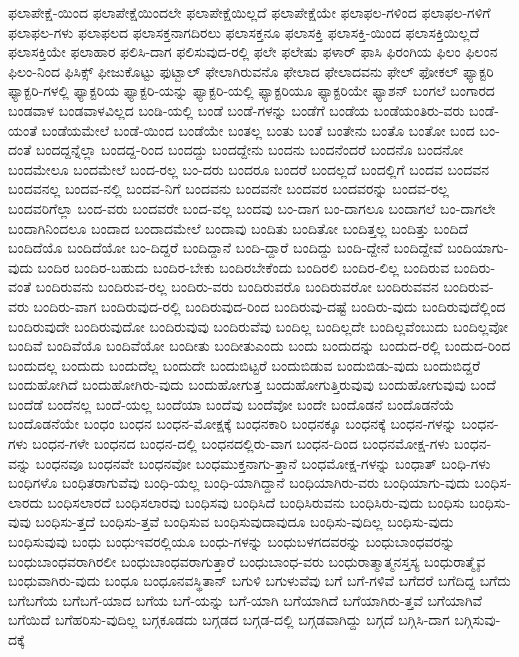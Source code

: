 {ಫಲಾಪೇಕ್ಷೆ-ಯಿಂದ
ಫಲಾಪೇಕ್ಷೆಯಿಂದಲೇ
ಫಲಾಪೇಕ್ಷೆಯಿಲ್ಲದೆ
ಫಲಾಪೇಕ್ಷೆಯೇ
ಫಲಾಫಲ-ಗಳಿಂದ
ಫಲಾಫಲ-ಗಳಿಗೆ
ಫಲಾಫಲ-ಗಳು
ಫಲಾಫಲದ
ಫಲಾಸಕ್ತನಾಗದಿರಲು
ಫಲಾಸಕ್ತನೂ
ಫಲಾಸಕ್ತಿ
ಫಲಾಸಕ್ತಿ-ಯಿಂದ
ಫಲಾಸಕ್ತಿಯಿಲ್ಲದೆ
ಫಲಾಸಕ್ತಿಯೇ
ಫಲಾಹಾರ
ಫಲಿಸಿ-ದಾಗ
ಫಲಿಸುವುದ-ರಲ್ಲಿ
ಫಲೇ
ಫಲೇಷು
ಫಳಾರ್
ಫಾಸಿ
ಫಿರಂಗಿಯ
ಫಿಲಂ
ಫಿಲಂನ
ಫಿಲಂ-ನಿಂದ
ಫಿಸಿಕ್ಸ್
ಫೀಜುಕೊಟ್ಟು
ಫುಟ್ಬಾಲ್
ಫೇಲಾಗಿರುವನೊ
ಫೇಲಾದ
ಫೇಲಾದವನು
ಫೇಲ್
ಫೋಕಲ್
ಫ್ಯಾಕ್ಟರಿ
ಫ್ಯಾಕ್ಟರಿ-ಗಳಲ್ಲಿ
ಫ್ಯಾಕ್ಟರಿಯ
ಫ್ಯಾಕ್ಟರಿ-ಯನ್ನು
ಫ್ಯಾಕ್ಟರಿ-ಯಲ್ಲಿ
ಫ್ಯಾಕ್ಟರಿಯೂ
ಫ್ಯಾಕ್ಟರಿಯೇ
ಫ್ಯಾಶನ್
ಬಂಗಲೆ
ಬಂಗಾರದ
ಬಂಡವಾಳ
ಬಂಡವಾಳವಿಲ್ಲದ
ಬಂಡಿ-ಯಲ್ಲಿ
ಬಂಡೆ
ಬಂಡೆ-ಗಳನ್ನು
ಬಂಡೆಗೆ
ಬಂಡೆಯ
ಬಂಡೆಯಂತಿರು-ವರು
ಬಂಡೆ-ಯಂತೆ
ಬಂಡೆಯಮೇಲೆ
ಬಂಡೆ-ಯಿಂದ
ಬಂಡೆಯೇ
ಬಂತಲ್ಲ
ಬಂತು
ಬಂತೆ
ಬಂತೇನು
ಬಂತೊ
ಬಂತೋ
ಬಂದ
ಬಂ-ದಂತೆ
ಬಂದದ್ದನ್ನೆಲ್ಲಾ
ಬಂದದ್ದ-ರಿಂದ
ಬಂದದ್ದು
ಬಂದದ್ದೇನು
ಬಂದನು
ಬಂದನೆಂದರೆ
ಬಂದನೊ
ಬಂದನೋ
ಬಂದಮೇಲೂ
ಬಂದಮೇಲೆ
ಬಂದ-ರಲ್ಲ
ಬಂ-ದರು
ಬಂದರೂ
ಬಂದರೆ
ಬಂದಲ್ಲದೆ
ಬಂದಲ್ಲಿಗೆ
ಬಂದವ
ಬಂದವನ
ಬಂದವನಲ್ಲ
ಬಂದವ-ನಲ್ಲಿ
ಬಂದವ-ನಿಗೆ
ಬಂದವನು
ಬಂದವನೇ
ಬಂದವರ
ಬಂದವರನ್ನು
ಬಂದವ-ರಲ್ಲ
ಬಂದವರಿಗೆಲ್ಲಾ
ಬಂದ-ವರು
ಬಂದವರೇ
ಬಂದ-ವಲ್ಲ
ಬಂದವು
ಬಂ-ದಾಗ
ಬಂ-ದಾಗಲೂ
ಬಂದಾಗಲೆ
ಬಂ-ದಾಗಲೇ
ಬಂದಾಗಿನಿಂದಲೂ
ಬಂದಾದ
ಬಂದಾದಮೇಲೆ
ಬಂದಾವು
ಬಂದಿತು
ಬಂದಿತೋ
ಬಂದಿತ್ತಲ್ಲ
ಬಂದಿತ್ತು
ಬಂದಿದೆ
ಬಂದಿದೆಯೊ
ಬಂದಿದೆಯೋ
ಬಂ-ದಿದ್ದರೆ
ಬಂದಿದ್ದಾನೆ
ಬಂದಿ-ದ್ದಾರೆ
ಬಂದಿದ್ದು
ಬಂದಿ-ದ್ದೇನೆ
ಬಂದಿದ್ದೇವೆ
ಬಂದಿಯಾಗು-ವುದು
ಬಂದಿರ
ಬಂದಿರ-ಬಹುದು
ಬಂದಿರ-ಬೇಕು
ಬಂದಿರಬೇಕೆಂದು
ಬಂದಿರಲಿ
ಬಂದಿರ-ಲಿಲ್ಲ
ಬಂದಿರುವ
ಬಂದಿರು-ವಂತೆ
ಬಂದಿರುವನು
ಬಂದಿರುವ-ರಲ್ಲ
ಬಂದಿರು-ವರು
ಬಂದಿರುವರೊ
ಬಂದಿರುವರೋ
ಬಂದಿರುವವನ
ಬಂದಿರುವ-ವರು
ಬಂದಿರು-ವಾಗ
ಬಂದಿರುವುದ-ರಲ್ಲಿ
ಬಂದಿರುವುದ-ರಿಂದ
ಬಂದಿರುವು-ದಷ್ಟೆ
ಬಂದಿರು-ವುದು
ಬಂದಿರುವುದೆಲ್ಲಿಂದ
ಬಂದಿರುವುದೇ
ಬಂದಿರುವುದೋ
ಬಂದಿರುವುವು
ಬಂದಿರುವೆವು
ಬಂದಿಲ್ಲ
ಬಂದಿಲ್ಲದೇ
ಬಂದಿಲ್ಲವೆಂಬುದು
ಬಂದಿಲ್ಲವೋ
ಬಂದಿವೆ
ಬಂದಿವೆಯೊ
ಬಂದಿವೆಯೋ
ಬಂದೀತು
ಬಂದೀತುಎಂದು
ಬಂದು
ಬಂದುದನ್ನು
ಬಂದುದ-ರಲ್ಲಿ
ಬಂದುದ-ರಿಂದ
ಬಂದುದಲ್ಲ
ಬಂದುದು
ಬಂದುದೆಲ್ಲ
ಬಂದುದೇ
ಬಂದುಬಿಟ್ಟರೆ
ಬಂದುಬಿಡುವ
ಬಂದುಬಿಡು-ವುದು
ಬಂದುಬಿದ್ದರೆ
ಬಂದುಹೋಗಿದೆ
ಬಂದುಹೋಗಿರು-ವುದು
ಬಂದುಹೋಗುತ್ತ
ಬಂದುಹೋಗುತ್ತಿರುವುವು
ಬಂದುಹೋಗುವುವು
ಬಂದೆ
ಬಂದೆಡೆ
ಬಂದೆನಲ್ಲ
ಬಂದೆ-ಯಲ್ಲ
ಬಂದೆಯಾ
ಬಂದೆವು
ಬಂದೆವೋ
ಬಂದೇ
ಬಂದೊಡನೆ
ಬಂದೊಡನೆಯೆ
ಬಂದೊಡನೆಯೇ
ಬಂಧಂ
ಬಂಧನ
ಬಂಧನ-ಮೋಕ್ಷಕ್ಕೆ
ಬಂಧನಕಾರಿ
ಬಂಧನಕ್ಕೂ
ಬಂಧನಕ್ಕೆ
ಬಂಧನ-ಗಳನ್ನು
ಬಂಧನ-ಗಳು
ಬಂಧನ-ಗಳೇ
ಬಂಧನದ
ಬಂಧನ-ದಲ್ಲಿ
ಬಂಧನದಲ್ಲಿರು-ವಾಗ
ಬಂಧನ-ದಿಂದ
ಬಂಧನಮೋಕ್ಷ-ಗಳು
ಬಂಧನ-ವನ್ನು
ಬಂಧನವೂ
ಬಂಧನವೇ
ಬಂಧನವೋ
ಬಂಧಮುಕ್ತನಾಗು-ತ್ತಾನೆ
ಬಂಧಮೋಕ್ಷ-ಗಳನ್ನು
ಬಂಧಾತ್
ಬಂಧಿ-ಗಳು
ಬಂಧಿಗಳೊ
ಬಂಧಿತರಾಗುವೆವು
ಬಂಧಿ-ಯಲ್ಲ
ಬಂಧಿ-ಯಾಗಿದ್ದಾನೆ
ಬಂಧಿಯಾಗಿರು-ವರು
ಬಂಧಿಯಾಗು-ವುದು
ಬಂಧಿಸ-ಲಾರದು
ಬಂಧಿಸಲಾರದೆ
ಬಂಧಿಸಲಾರವು
ಬಂಧಿಸವು
ಬಂಧಿಸಿದೆ
ಬಂಧಿಸಿರುವನು
ಬಂಧಿಸಿರು-ವುದು
ಬಂಧಿಸು
ಬಂಧಿಸು-ವುವು
ಬಂಧಿಸು-ತ್ತದೆ
ಬಂಧಿಸು-ತ್ತವೆ
ಬಂಧಿಸುವ
ಬಂಧಿಸುವುದಾವುದೂ
ಬಂಧಿಸು-ವುದಿಲ್ಲ
ಬಂಧಿಸು-ವುದು
ಬಂಧಿಸುವುವು
ಬಂಧು
ಬಂಧುಇವರಲ್ಲಿಯೂ
ಬಂಧು-ಗಳನ್ನು
ಬಂಧುಬಳಗದವರನ್ನು
ಬಂಧುಬಾಂಧವರನ್ನು
ಬಂಧುಬಾಂಧವರಾಗಿರಲೀ
ಬಂಧುಬಾಂಧವರಾಗುತ್ತಾರೆ
ಬಂಧುಬಾಂಧ-ವರು
ಬಂಧುರಾತ್ಮಾತ್ಮನಸ್ತಸ್ಯ
ಬಂಧುರಾತ್ಮೈವ
ಬಂಧುವಾಗಿರು-ವುದು
ಬಂಧೂ
ಬಂಧೂನವಸ್ಥಿತಾನ್
ಬಗುಳಿ
ಬಗುಳುವೆವು
ಬಗೆ
ಬಗೆ-ಗಳಿವೆ
ಬಗೆದರೆ
ಬಗೆದಿದ್ದ
ಬಗೆದು
ಬಗೆಬಗೆಯ
ಬಗೆಬಗೆ-ಯಾದ
ಬಗೆಯ
ಬಗೆ-ಯನ್ನು
ಬಗೆ-ಯಾಗಿ
ಬಗೆಯಾಗಿದೆ
ಬಗೆಯಾಗಿರು-ತ್ತವೆ
ಬಗೆಯಾಗಿವೆ
ಬಗೆಯಿದೆ
ಬಗೆಹರಿಸು-ವುದಿಲ್ಲ
ಬಗ್ಗಕೂಡದು
ಬಗ್ಗಡದ
ಬಗ್ಗಡ-ದಲ್ಲಿ
ಬಗ್ಗಡವಾಗಿದ್ದು
ಬಗ್ಗದೆ
ಬಗ್ಗಿಸಿ-ದಾಗ
ಬಗ್ಗಿಸುವು-ದಕ್ಕೆ
}
